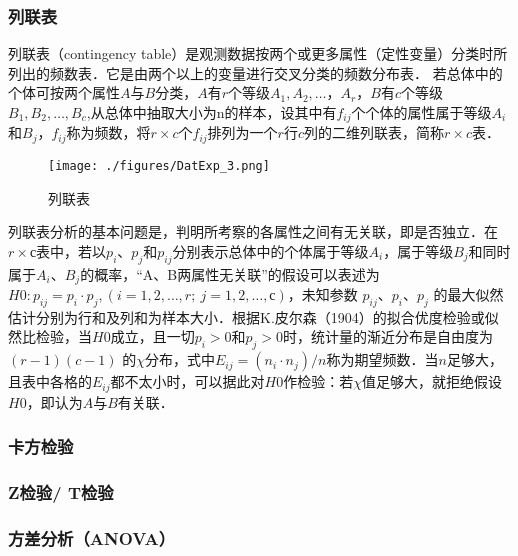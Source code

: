 \subsubsection{列联表}
列联表（contingency table）是观测数据按两个或更多属性（定性变量）分类时所列出的频数表．它是由两个以上的变量进行交叉分类的频数分布表．
若总体中的个体可按两个属性$A$与$B$分类，$A$有$r$个等级$A_1,A_2,…，A_r$，$B$有$c$个等级$B_1,B_2,\dots, B_c$,从总体中抽取大小为n的样本，设其中有$f_{ij}$个个体的属性属于等级$A_i$和$B_j$，$f_{ij}$称为频数，将$r\times c$个$f_{ij}$排列为一个$r$行$c$列的二维列联表，简称$r×c$表．
\begin{figure}[ht]
\centering
\texttt{[image: ./figures/DatExp\_3.png]}
\caption{列联表} \label{DatExp_fig3}
\end{figure}
列联表分析的基本问题是，判明所考察的各属性之间有无关联，即是否独立．在$r×с$表中，若以$p_i$、$p_j$和$p_{ij}$分别表示总体中的个体属于等级$A_i$，属于等级$B_j$和同时属于$A_i$、$B_j$的概率，“A、B两属性无关联”的假设可以表述为$H0: p_{ij}=p_i\cdot p_j, (i=1,2,\dots, r; \ j=1,2,\dots,с)$，未知参数 $p_{ij}$、$p_i$、$p_j$ 的最大似然估计分别为行和及列和为样本大小．根据K.皮尔森（1904）的拟合优度检验或似然比检验，当$H0$成立，且一切$p_i>0$和$p_j>0$时，统计量的渐近分布是自由度为$(r-1)(c-1)$ 的$\chi$分布，式中$E_{ij}=(n_i \cdot n_j)/n$称为期望频数．当$n$足够大，且表中各格的$E_{ij}$都不太小时，可以据此对$H0$作检验：若$\chi$值足够大，就拒绝假设$H0$，即认为$A$与$B$有关联．
\subsubsection{卡方检验}
\subsubsection{Z检验/ T检验}
\subsubsection{方差分析（ANOVA）}
